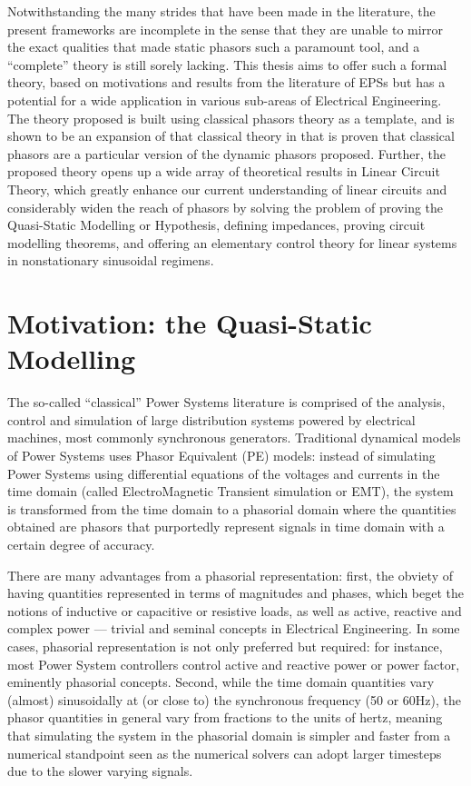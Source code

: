 	Notwithstanding the many strides that have been made in the literature, the present frameworks are incomplete in the sense that they are unable to mirror the exact qualities that made static phasors such a paramount tool, and a ``complete'' theory is still sorely lacking. This thesis aims to offer such a formal theory, based on motivations and results from the literature of EPSs but has a potential for a wide application in various sub-areas of Electrical Engineering. The theory proposed is built using classical phasors theory as a template, and is shown to be an expansion of that classical theory in that is proven that classical phasors are a particular version of the dynamic phasors proposed. Further, the proposed theory opens up a wide array of theoretical results in Linear Circuit Theory, which greatly enhance our current understanding of linear circuits and considerably widen the reach of phasors by solving the problem of proving the Quasi-Static Modelling or Hypothesis, defining impedances, proving circuit modelling theorems, and offering an elementary control theory for linear systems in nonstationary sinusoidal regimens.

\section{Motivation: the Quasi-Static Modelling}\label{subsec:intro_motivation} %

	The so-called ``classical'' Power Systems literature is comprised of the analysis, control and simulation of large distribution systems powered by electrical machines, most commonly synchronous generators. Traditional dynamical models of Power Systems uses Phasor Equivalent (PE) models: instead of simulating Power Systems using differential equations of the voltages and currents in the time domain (called ElectroMagnetic Transient simulation or EMT), the system is transformed from the time domain to a phasorial domain where the quantities obtained are phasors that purportedly represent signals in time domain with a certain degree of accuracy.
	
	There are many advantages from a phasorial representation: first, the obviety of having quantities represented in terms of magnitudes and phases, which beget the notions of inductive or capacitive or resistive loads, as well as active, reactive and complex power — trivial and seminal concepts in Electrical Engineering. In some cases, phasorial representation is not only preferred but required: for instance, most Power System controllers control active and reactive power or power factor, eminently phasorial concepts. Second, while the time domain quantities vary (almost) sinusoidally at (or close to) the synchronous frequency (50 or 60Hz), the phasor quantities in general vary from fractions to the units of hertz, meaning that simulating the system in the phasorial domain is simpler and faster from a numerical standpoint seen as the numerical solvers can adopt larger timesteps due to the slower varying signals.

